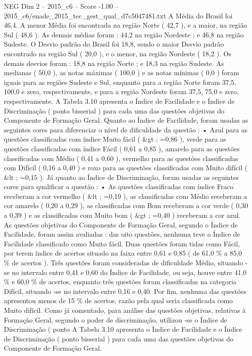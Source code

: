 \begin{textsample}{NEG Dim 2 – 2015\_c6 – Score -1.00 – 2015\_c6/enade\_2015\_tec\_gest\_qual\_d7c5047481.txt}
A Média do Brasil foi 46,4.
A menor Média foi encontrada na região Norte ( 42,7 ), e a maior, na região Sul ( 48,6 ).
As demais médias foram : 44,2 na região Nordeste ; e 46,8 na região Sudeste.
O Desvio padrão do Brasil foi 18,8, sendo o maior Desvio padrão encontrado na região Sul ( 20,0 ), e o menor, na região Nordeste ( 18,2 ).
Os demais desvios foram : 18,8 na região Norte ; e 18,3 na região Sudeste.
As medianas ( 50,0 ), as notas máximas ( 100,0 ) e as notas mínimas ( 0,0 ) foram iguais para as regiões Sudeste e Sul, enquanto para a região Norte foram 37,5, 100,0 e zero, respectivamente, e para a região Nordeste foram 37,5, 75,0 e zero, respectivamente.
A Tabela 3.10 apresenta o Índice de Facilidade e o Índice de Discriminação ( ponto bisserial ) para cada uma das questões objetivas do Componente de Formação Geral.
Quanto ao Índice de Facilidade, foram usadas as seguintes cores para diferenciar o nível de dificuldade da questão : • Azul para as questões classificadas com índice Muito fácil ( \&gt ; =0,86 ), verde para as questões classificadas com índice Fácil ( 0,61 a 0,85 ), amarelo para as questões classificadas com Médio ( 0,41 a 0,60 ), vermelho para as questões classificadas com Difícil ( 0,16 a 0,40 ) e roxo para as questões classificadas com Muito difícil ( \&lt ; =0,15 ).
Já quanto ao Índice de Discriminação, foram usadas as seguintes cores para qualificar a questão : • As questões classificadas com índice Fraco receberam a cor vermelho ( \&lt ; =0,19 ), as classificadas com Médio receberam a cor amarelo ( 0,20 a 0,29 ), as classificadas com Bom receberam a cor verde ( 0,30 a 0,39 ) e as classificadas com Muito bom ( \&gt ; =0,40 ) receberam a cor azul.
As questões objetivas do Componente de Formação Geral, segundo o Índice de Facilidade, foram assim avaliadas : das oito questões, nenhuma teve o Índice de Facilidade classificado como Muito fácil.
Duas questões foram tidas como Fácil, por terem índice de acertos situado na faixa entre 0,61 e 0,85 ( de 61,0 \% a 85,0 \% de acertos ).
Três questões foram consideradas de dificuldade Médio, situando -se no intervalo entre 0,41 e 0,60 do Índice de Facilidade, ou seja, houve entre 41,0 \% e 60,0 \% de acertos, enquanto três questões foram classificadas na categoria Difícil, situando -se no intervalo entre 0,16 e 0,40.
Por fim, nenhuma das questões apresentou menos de 15 \% de acertos, razão pela qual seria classificada como Muito difícil.
Como já comentado, para análise das questões objetivas, relativas à Formação Geral, segundo o poder de discriminação, utilizou -se o Índice de Discriminação ( ponto A Tabela 3.10 apresenta o Índice de Facilidade e o Índice de Discriminação ( ponto bisserial ) para cada uma das questões objetivas do Componente de Formação Geral.

\end{textsample}
